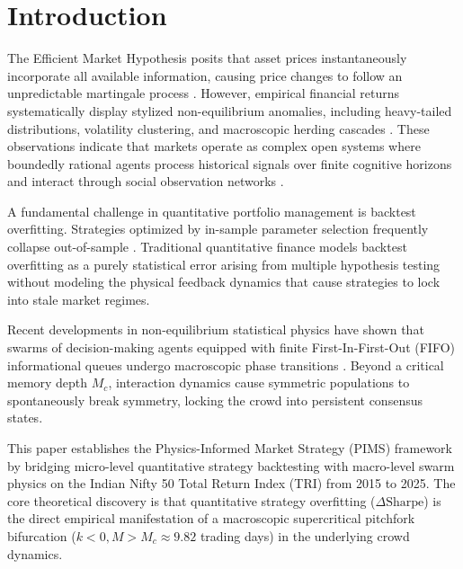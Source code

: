 \section{Introduction}

The Efficient Market Hypothesis posits that asset prices instantaneously incorporate all available information, causing price changes to follow an unpredictable martingale process \cite{fama1970efficient}. However, empirical financial returns systematically display stylized non-equilibrium anomalies, including heavy-tailed distributions, volatility clustering, and macroscopic herding cascades \cite{lux1999scaling, cont2001empirical, shiller2000irrational}. These observations indicate that markets operate as complex open systems where boundedly rational agents process historical signals over finite cognitive horizons and interact through social observation networks \cite{bouchaud2013more, farmer2009economy, kirman1993ants}.

A fundamental challenge in quantitative portfolio management is backtest overfitting. Strategies optimized by in-sample parameter selection frequently collapse out-of-sample \cite{bailey2017probability}. Traditional quantitative finance models backtest overfitting as a purely statistical error arising from multiple hypothesis testing without modeling the physical feedback dynamics that cause strategies to lock into stale market regimes.

Recent developments in non-equilibrium statistical physics have shown that swarms of decision-making agents equipped with finite First-In-First-Out (FIFO) informational queues undergo macroscopic phase transitions \cite{li2026informational}. Beyond a critical memory depth $M_c$, interaction dynamics cause symmetric populations to spontaneously break symmetry, locking the crowd into persistent consensus states.

This paper establishes the Physics-Informed Market Strategy (PIMS) framework by bridging micro-level quantitative strategy backtesting with macro-level swarm physics on the Indian Nifty 50 Total Return Index (TRI) from 2015 to 2025. The core theoretical discovery is that quantitative strategy overfitting ($\Delta \text{Sharpe}$) is the direct empirical manifestation of a macroscopic supercritical pitchfork bifurcation ($k < 0, M > M_c \approx 9.82$ trading days) in the underlying crowd dynamics.

